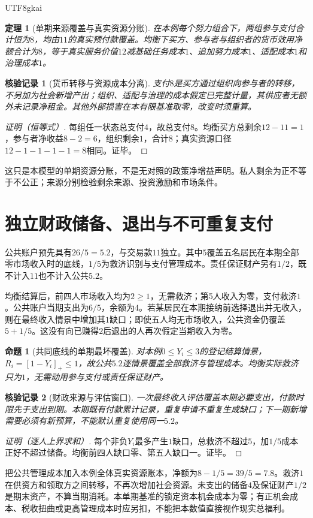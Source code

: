\documentclass[12pt,a4paper,openany]{report}
\newtheorem{theorem}{定理}[chapter]
\newtheorem{proposition}{命题}[chapter]
\newtheorem{Certificate}{核验记录}[chapter]
\begin{document}
\begin{CJK*}{UTF8}{gkai}
\begin{theorem}[单期来源覆盖与真实资源分账]
\label{thm:example-budget}
在本例每个努力组合下，两组参与支付合计恒为$8$，均由$11$的真实预付款覆盖。均衡下买方、参与者与组织者的货币效用净额合计为$8$，等于真实服务价值$12$减基础任务成本$1$、追加努力成本$1$、适配成本$1$和治理成本$1$。
\end{theorem}
\begin{Certificate}[货币转移与资源成本分离]
支付$8$是买方通过组织向参与者的转移，不另加为社会新增产出；组织、适配与治理的成本假定已完整计量，其供应者无额外未记录净租金。其他外部损害在本有限基准取零，改变时须重算。
\end{Certificate}
\begin{proof}[证明（恒等式）]
每组任一状态总支付$4$，故总支付$8$。均衡买方总剩余$12-11=1$，参与者净收益$8-2=6$，组织剩余$1$，合计$8$；真实资源口径$12-1-1-1-1=8$相同。证毕。
\end{proof}
这只是本模型的单期资源分账，不是无对照的政策净增益声明。私人剩余为正不等于不公正；来源\cite[“合同剩余索取与差异化收入”]{SourceMarket}分别检验剩余来源、投资激励和市场条件。

\section{独立财政储备、退出与不可重复支付}
公共账户预先具有$26/5=5.2$，与交易款$11$独立。其中$5$覆盖五名居民在本期全部零市场收入时的底线，$1/5$为救济识别与支付管理成本。责任保证财产另有$1/2$，既不计入$11$也不计入公共$5.2$。

均衡结算后，前四人市场收入均为$2\ge1$，无需救济；第5人收入为零，支付救济$1$。公共账户当期支出为$6/5$，余额为$4$。若某居民在本期接纳前选择退出并无收入，则在最终收入情景中增加其$1$缺口；即使五人均无市场收入，公共资金仍覆盖$5+1/5$。这没有向已赚得$2$后退出的人再次假定当期收入为零。
\begin{proposition}[共同底线的单期最坏覆盖]
\label{prop:example-floor}
对本例$0\le Y_i\le3$的登记结算情景，$R_i=[1-Y_i]_+\le1$，故公共$5.2$逐情景覆盖全部救济与管理成本。均衡实际救济只为$1$，无需动用参与支付或责任保证财产。
\end{proposition}
\begin{Certificate}[财政来源与评估窗口]
一次最终收入评估覆盖本期必要支出，付款时限先于支出到期。本期既有付款累计记录，重复申请不重复生成缺口；下一期新增需要必须有新预算，不能默认重复使用同一$5.2$。
\end{Certificate}
\begin{proof}[证明（逐人上界求和）]
每个非负$Y_i$最多产生$1$缺口，总救济不超过$5$，加$1/5$成本正好不超过储备。均衡前四人缺口零、第五人缺口一。证毕。
\end{proof}
把公共管理成本加入本例全体真实资源账本，净额为$8-1/5=39/5=7.8$。救济$1$在供资方和领取方之间转移，不再次增加社会资源。未支出的储备$4$及保证财产$1/2$是期末资产，不算当期消耗。本单期基准的锁定资本机会成本为零；有正机会成本、税收扭曲或更高管理成本时应另扣，不能把本数值直接视作现实总福利。


\end{CJK*}
\end{document}
